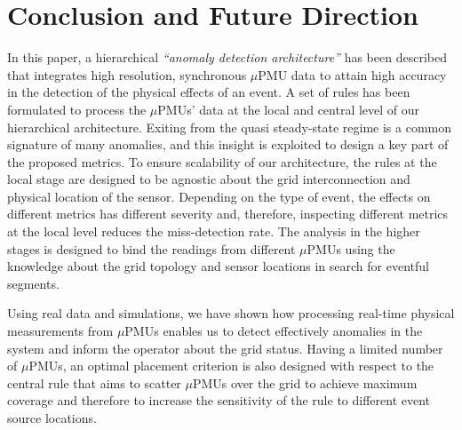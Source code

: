 \documentclass[twocolumn]{IEEEtran}
\newcommand{\mup}{\mu \text{PMU}}
\begin{document}
\section{Conclusion and Future Direction}
In this paper, a hierarchical \textit{``anomaly detection architecture''} has been described that integrates high resolution, synchronous $\mup$ data to attain high accuracy in the detection of the physical effects of an event. 
A set of rules has been formulated to process the $\mup$s' data at the local and central level of our hierarchical architecture. Exiting from the quasi steady-state regime is a common signature of many anomalies, and this insight is exploited to design a key part of the proposed metrics. To ensure scalability of our architecture, the rules at the local stage are designed to be agnostic about the grid interconnection and physical location of the sensor. Depending on the type of event, the effects on different metrics has different severity and, therefore, inspecting different metrics at the local level reduces the miss-detection rate. The analysis in the higher stages is designed to bind the readings from different $\mup$s using the knowledge about the grid topology and sensor locations in search for eventful segments.    

Using real data and simulations, we have shown how processing real-time physical measurements from $\mup$s enables us to detect effectively anomalies in the system and inform the operator about the grid status. 
Having a limited number of $\mup$s, an optimal placement criterion is also designed with respect to the central rule that aims to scatter $\mup$s over the grid to achieve maximum coverage and therefore to increase the sensitivity of the rule to different event source locations.
\end{document}
